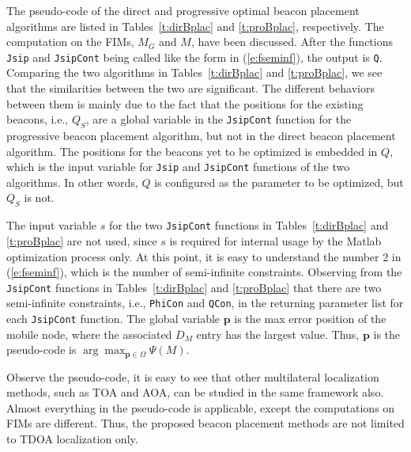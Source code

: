 The pseudo-code of the direct and progressive optimal beacon placement algorithms are listed in Tables~\ref{t:dirBplac} and \ref{t:proBplac}, respectively. The computation on the FIMs, $M_G$ and $M$, have been discussed. After the functions \texttt{Jsip} and \texttt{JsipCont} being called like the form in (\ref{e:fseminf}), the output is \texttt{Q}.
    Comparing the two algorithms in Tables~\ref{t:dirBplac} and \ref{t:proBplac}, we see that the similarities between the two are significant. The different behaviors between them is mainly due to the fact that the positions for the existing beacons, i.e., $Q_S$, are a global variable in the \texttt{JsipCont} function for the progressive beacon placement algorithm, but not in the direct beacon placement algorithm. The positions for the beacons yet to be optimized is embedded in $Q$, which is the input variable for \texttt{Jsip} and \texttt{JsipCont} functions of the two algorithms. In other words, $Q$ is configured as the parameter to be optimized, but $Q_S$ is not.

The input variable $s$ for the two \texttt{JsipCont} functions in Tables~\ref{t:dirBplac} and \ref{t:proBplac} are not used, since $s$ is required for internal usage by the Matlab optimization process only.
    At this point, it is easy to understand the number 2 in (\ref{e:fseminf}), which is the number of semi-infinite constraints. Observing from the \texttt{JsipCont} functions in Tables~\ref{t:dirBplac} and \ref{t:proBplac} that there are two semi-infinite constraints, i.e., \texttt{PhiCon} and \texttt{QCon}, in the returning parameter list for each \texttt{JsipCont} function.
 The global variable $\mathbf{p}$ is the max error position of the mobile node, where the associated $D_M$ entry has the largest value. Thus, $\mathbf{p}$ is the pseudo-code is $\arg\max_{\mathbf{p}\in\Omega}\Psi(M)$.


Observe the pseudo-code, it is easy to see that other multilateral localization methods, such as TOA and AOA, can be studied in the same framework also. Almost everything in the pseudo-code is applicable, except the computations on FIMs are different. Thus, the proposed beacon placement methods are not limited to TDOA localization only.



